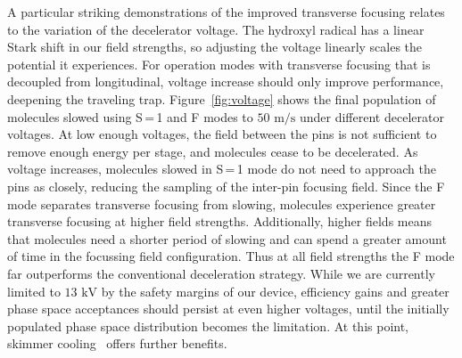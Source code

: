 \documentclass[%
 reprint,
 amsmath,amssymb,
 aps,
prl,
]{revtex4-1}
\begin{document}
A particular striking demonstrations of the improved transverse focusing relates to the variation of the decelerator voltage. The hydroxyl radical has a linear Stark shift in our field strengths, so adjusting the voltage linearly scales the potential it experiences.
For operation modes with transverse focusing that is decoupled from longitudinal, voltage increase should only improve performance, deepening the traveling trap.
Figure~\ref{fig:voltage} shows the final population of molecules slowed using S\,=\,1 and F modes to $50 \text{ m/s}$ under different decelerator voltages.
At low enough voltages, the field between the pins is not sufficient to remove enough energy per stage, and molecules cease to be decelerated.
As voltage increases, molecules slowed in S\,=\,1 mode do not need to approach the pins as closely, reducing the sampling of the inter-pin focusing field.
Since the F mode separates transverse focusing from slowing, molecules experience greater transverse focusing at higher field strengths.
Additionally, higher fields means that molecules need a shorter period of slowing and can spend a greater amount of time in the focussing field configuration.
Thus at all field strengths the F mode far outperforms the conventional deceleration strategy.
While we are currently limited to $13 \text{ kV}$ by the safety margins of our device, efficiency gains and greater phase space acceptances should persist at even higher voltages, until the initially populated phase space distribution becomes the limitation.
At this point, skimmer cooling~\cite{Wu2018} offers further benefits.
\end{document}
